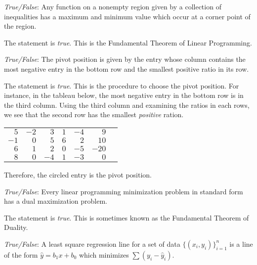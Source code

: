 \documentclass[11pt,letterpaper]{article}
\begin{document}
\newpage



\quizsol \textit{True/False}: Any function on a nonempty region given by a collection of inequalities has a maximum and minimum value which occur at a corner point of the region. \pspace

\sol The statement is \textit{true}. This is the Fundamental Theorem of Linear Programming. \pvspace{1cm}



\quizsol \textit{True/False}: The pivot position is given by the entry whose column contains the most negative entry in the bottom row and the smallest positive ratio in its row. \pspace

\sol The statement is \textit{true}. This is the procedure to choose the pivot position. For instance, in the tableau below, the most negative entry in the bottom row is in the third column. Using the third column and examining the ratios in each rows, we see that the second row has the smallest \textit{positive} ration. 
	\begin{table}[!ht]
	\centering
	\begin{tabular}{rrrrr|rr}
	$5$ & $-2$ & $3$ & $1$ & $-4$ & $9$ & \quad {\footnotesize $9/3= 3$} \\
	$-1$ & $0$ & \textcircled{$5$} & $6$ & $2$ & $10$ & \quad {\footnotesize $10/5= 2$} \\
	$6$ & $1$ & $2$ & $0$ & $-5$ & $-20$ & \quad {\footnotesize $-20/2= -10$} \\ \cline{1-6}
	$8$ & $0$ & $-4$ & $1$ & $-3$ & $0$ & \\
	\end{tabular}
	\end{table} \par
Therefore, the circled entry is the pivot position. \pvspace{1cm}



\quizsol \textit{True/False}: Every linear programming minimization problem in standard form has a dual maximization problem. \pspace

\sol The statement is \textit{true}. This is sometimes known as the Fundamental Theorem of Duality. \pvspace{1cm}



\quizsol \textit{True/False}: A least square regression line for a set of data $\{ (x_i, y_i) \}_{i=1}^n$ is a line of the form $\widehat{y}= b_1x + b_0$ which minimizes $\sum (y_i - \widehat{y}_i)$. \pspace
\end{document}
